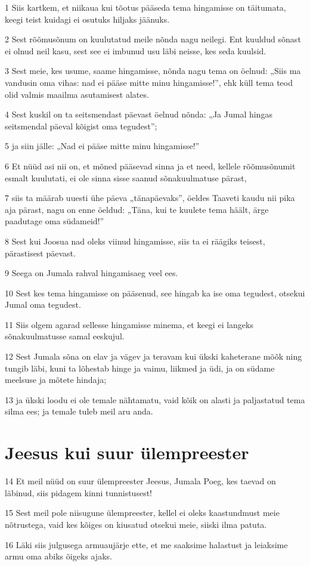 \par 1 Siis kartkem, et niikaua kui tõotus pääseda tema hingamisse on täitumata, keegi teist kuidagi ei osutuks hiljaks jäänuks.
\par 2 Sest rõõmusõnum on kuulutatud meile nõnda nagu neilegi. Ent kuuldud sõnast ei olnud neil kasu, sest see ei imbunud usu läbi neisse, kes seda kuulsid.
\par 3 Sest meie, kes usume, saame hingamisse, nõnda nagu tema on öelnud: „Siis ma vandusin oma vihas: nad ei pääse mitte minu hingamisse!”, ehk küll tema teod olid valmis maailma asutamisest alates.
\par 4 Sest kuskil on ta seitsmendast päevast öelnud nõnda: „Ja Jumal hingas seitsmendal päeval kõigist oma tegudest”;
\par 5 ja siin jälle: „Nad ei pääse mitte minu hingamisse!”
\par 6 Et nüüd asi nii on, et mõned pääsevad sinna ja et need, kellele rõõmusõnumit esmalt kuulutati, ei ole sinna sisse saanud sõnakuulmatuse pärast,
\par 7 siis ta määrab uuesti ühe päeva „tänapäevaks”, öeldes Taaveti kaudu nii pika aja pärast, nagu on enne öeldud: „Täna, kui te kuulete tema häält, ärge paadutage oma südameid!”
\par 8 Sest kui Joosua nad oleks viinud hingamisse, siis ta ei räägiks teisest, pärastisest päevast.
\par 9 Seega on Jumala rahval hingamisaeg veel ees.
\par 10 Sest kes tema hingamisse on pääsenud, see hingab ka ise oma tegudest, otsekui Jumal oma tegudest.
\par 11 Siis olgem agarad sellesse hingamisse minema, et keegi ei langeks sõnakuulmatusse samal eeskujul.
\par 12 Sest Jumala sõna on elav ja vägev ja teravam kui ükski kaheterane mõõk ning tungib läbi, kuni ta lõhestab hinge ja vaimu, liikmed ja üdi, ja on südame meelsuse ja mõtete hindaja;
\par 13 ja ükski loodu ei ole temale nähtamatu, vaid kõik on alasti ja paljastatud tema silma ees; ja temale tuleb meil aru anda.

\section*{Jeesus kui suur ülempreester}

\par 14 Et meil nüüd on suur ülempreester Jeesus, Jumala Poeg, kes taevad on läbinud, siis pidagem kinni tunnistusest!
\par 15 Sest meil pole niisugune ülempreester, kellel ei oleks kaastundmust meie nõtrustega, vaid kes kõiges on kiusatud otsekui meie, siiski ilma patuta.
\par 16 Läki siis julgusega armuaujärje ette, et me saaksime halastust ja leiaksime armu oma abiks õigeks ajaks.



